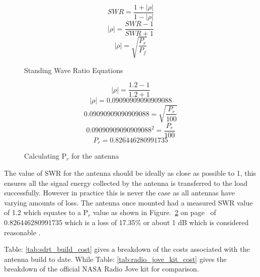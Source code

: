 %
\begin{figure}[here]
  \centering
  \begin{equation}
  	SWR = \frac{1 + |\rho|}{1 - |\rho|} 
  \end{equation}
  \begin{equation}
  	|\rho| = \frac{SWR - 1}{SWR + 1} 
  \end{equation}
  \begin{equation}
  	|\rho| = \sqrt{\frac{P_r}{P_f}}
  \end{equation}
  \caption{Standing Wave Ratio Equations}
  \label{fig:swr_equation}
\end{figure}
%

%
\begin{figure}[here]
  \centering
  \begin{equation}
  	|\rho| = \frac{1.2 - 1}{1.2 + 1} 
  \end{equation}
  \begin{equation}
  	|\rho| = 0.09090909090909088
  \end{equation}
  \begin{equation}
  	0.09090909090909088 = \sqrt{\frac{P_r}{100}}
  \end{equation}
  \begin{equation}
  	0.09090909090909088^2 = \frac{P_r}{100}
  \end{equation}
  \begin{equation}
  	P_r = 0.826446280991735
  \end{equation}
  \caption{Calculating P$_{r}$ for the antenna}
  \label{fig:swr_equation_pr}
\end{figure}
%

The value of \gls{SWR} for the antenna should be ideally as close as possible to 1, this ensures all the signal energy collected by the antenna is transferred to the load successfully. However in practice this is never the case as all antennas have varying amounts of loss. The antenna once mounted had a measured \gls{SWR} value of 1.2 which equates to a P$_{r}$ value as shown in Figure.~\ref{fig:swr_equation_pr} on page~\pageref{fig:swr_equation_pr} of 0.826446280991735 which is a loss of 17.35\% or about 1 dB which is considered reasonable \citep{arrl-00}.

\newpage
Table: \ref{tab:sdrt_build_cost} gives a breakdown of the costs associated with the antenna build to date. While Table: \ref{tab:radio_jove_kit_cost} gives the breakdown of the official NASA Radio Jove kit for comparison.

